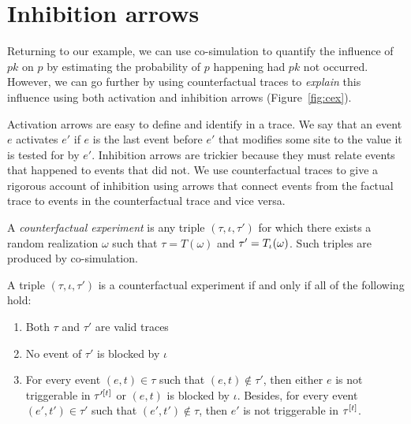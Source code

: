 \section{Inhibition arrows}\label{sec:inhibition}

Returning to our example, we can use co-simulation to quantify the
influence of $pk$ on $p$ by estimating the probability of $p$
happening had $pk$ not occurred. However, we can go further by using
counterfactual traces to \textit{explain} this influence using both
activation and inhibition arrows (Figure~\ref{fig:cex}).

Activation arrows are easy to define and identify in a trace. We say
that an event $e$ activates $e'$ if $e$ is the last event before $e'$
that modifies some site to the value it is tested for by
$e'$. Inhibition arrows are trickier because they must relate events
that happened to events that did not. We use counterfactual traces to
give a rigorous account of inhibition using arrows that connect events
from the factual trace to events in the counterfactual trace and vice
versa.

A \textit{counterfactual experiment} is any triple
$(\tau, \iota, \tau')$ for which there exists a random realization
$\omega$ such that $\tau = T(\omega)$ and $\tau' =
\ATRAJ{}(\omega)$. Such triples are produced by co-simulation.

\begin{proposition}%
  \label{prop:valid-cex}
  A triple $(\tau, \iota, \tau')$ is a counterfactual experiment if
  and only if all of the following hold:
  \begin{enumerate}[leftmargin=1.3cm, label=\textbf{VC\arabic*.}]
  \item \label{valid-cex:valid-traces} Both $\tau$ and $\tau'$ are
    valid traces
  \item \label{valid-cex:no-blocking} No event of $\tau'$ is blocked
    by $\iota$
  \item \label{valid-cex:co-occur} For every event $(e, t) \in \tau$
    such that $(e, t) \notin \tau'$, then either $e$ is not
    triggerable in $\TSTATE{t}{\tau'}$ or $(e, t)$ is blocked by
    $\iota$.  Besides, for every event $(e', t') \in \tau'$ such that
    $(e', t') \notin \tau$, then $e'$ is not triggerable in
    $\TSTATE{t}{\tau}$.
  \end{enumerate}
\end{proposition}


